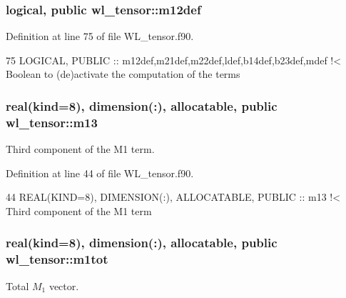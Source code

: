 \subsubsection[{\texorpdfstring{m12def}{m12def}}]{\setlength{\rightskip}{0pt plus 5cm}logical, public wl\+\_\+tensor\+::m12def}\hypertarget{namespacewl__tensor_a57e045045436974aaa5559870608eb8c}{}\label{namespacewl__tensor_a57e045045436974aaa5559870608eb8c}


Definition at line 75 of file W\+L\+\_\+tensor.\+f90.


\begin{DoxyCode}
75   \textcolor{keywordtype}{LOGICAL}, \textcolor{keywordtype}{PUBLIC} :: m12def,m21def,m22def,ldef,b14def,b23def,mdef\textcolor{comment}{ !< Boolean to (de)activate the
       computation of the terms}
\end{DoxyCode}
\subsubsection[{\texorpdfstring{m13}{m13}}]{\setlength{\rightskip}{0pt plus 5cm}real(kind=8), dimension(\+:), allocatable, public wl\+\_\+tensor\+::m13}\hypertarget{namespacewl__tensor_a3fd6e00295fde7edb66a55b18d3baa64}{}\label{namespacewl__tensor_a3fd6e00295fde7edb66a55b18d3baa64}


Third component of the M1 term. 



Definition at line 44 of file W\+L\+\_\+tensor.\+f90.


\begin{DoxyCode}
44   \textcolor{keywordtype}{REAL(KIND=8)}, \textcolor{keywordtype}{DIMENSION(:)}, \textcolor{keywordtype}{ALLOCATABLE}, \textcolor{keywordtype}{PUBLIC} :: m13\textcolor{comment}{    !< Third component of the M1 term}
\end{DoxyCode}
\subsubsection[{\texorpdfstring{m1tot}{m1tot}}]{\setlength{\rightskip}{0pt plus 5cm}real(kind=8), dimension(\+:), allocatable, public wl\+\_\+tensor\+::m1tot}\hypertarget{namespacewl__tensor_ac442e2b63d99baccc3cac2abd49c86ca}{}\label{namespacewl__tensor_ac442e2b63d99baccc3cac2abd49c86ca}


Total $M_1$ vector. 



